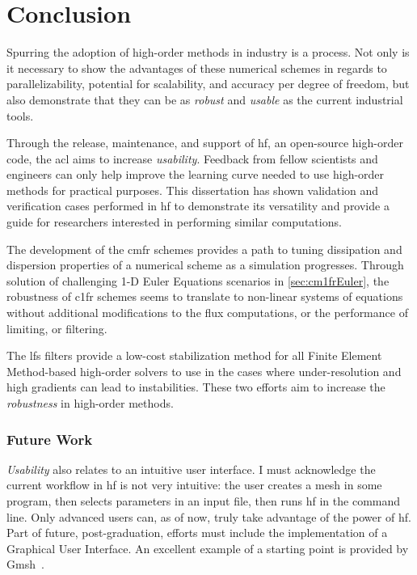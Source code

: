 \chapter{Conclusion}

Spurring the adoption of high-order methods in industry is a process. Not only is it necessary to show the advantages of these numerical schemes in regards to parallelizability, potential for scalability, and accuracy per degree of freedom, but also demonstrate that they can be as \emph{robust} and \emph{usable} as the current industrial tools.

Through the release, maintenance, and support of \gls{hf}, an open-source high-order code, the \gls{acl} aims to increase \emph{usability}. Feedback from fellow scientists and engineers can only help improve the learning curve needed to use high-order methods for practical purposes. This dissertation has shown validation and verification cases performed in \gls{hf} to demonstrate its versatility and provide a guide for researchers interested in performing similar computations.

The development of the \gls{cmfr} schemes provides a path to tuning dissipation and dispersion properties of a numerical scheme as a simulation progresses. Through solution of challenging 1-D Euler Equations scenarios in \ref{sec:cm1frEuler}, the robustness of \gls{c1fr} schemes seems to translate to non-linear systems of equations without additional modifications to the flux computations, or the performance of limiting, or filtering. 

The \gls{lfs} filters provide a low-cost stabilization method for all Finite Element Method-based high-order solvers to use in the cases where under-resolution and high gradients can lead to instabilities. These two efforts aim to increase the \emph{robustness} in high-order methods.

\subsection{Future Work}
\emph{Usability} also relates to an intuitive user interface. I must acknowledge the current workflow in \gls{hf} is not very intuitive: the user creates a mesh in some program, then selects parameters in an input file, then runs \gls{hf} in the command line. Only advanced users can, as of now, truly take advantage of the power of \gls{hf}. Part of future, post-graduation, efforts must include the implementation of a Graphical User Interface. An excellent example of a starting point is provided by Gmsh~\cite{geuzaine2009gmsh}.

